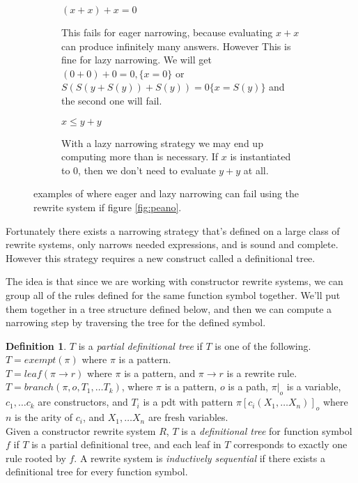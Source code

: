 \documentclass{book}
\theoremstyle{definition}
\newtheorem{definition}{Definition}[section]
\begin{document}
\begin{figure}[h]
  \begin{subfigure}{.45\textwidth}
      $(x + x) + x = 0$
    \caption{This fails for eager narrowing, because evaluating $x + x$ can produce infinitely many answers.
             However This is fine for lazy narrowing. We will get
             $(0 + 0) + 0 = 0, \{x = 0\}$
             or $S(S(y + S(y)) + S(y)) = 0 \{x = S(y)\}$
             and the second one will fail.}
  \end{subfigure}
  \hspace{.05\textwidth}
  \begin{subfigure}{.45\textwidth}
      $x \le y + y$
    \caption{With a lazy narrowing strategy we may end up computing more than is necessary.
             If $x$ is instantiated to $0$, then we don't need to evaluate $y + y$ at all.}
  \end{subfigure}
    \caption{examples of where eager and lazy narrowing can fail using the rewrite system
             if figure \ref{fig:peano}.}
    \label{NarrowingComp}
\end{figure}


Fortunately there exists a narrowing strategy that's defined on a large class of rewrite systems,
only narrows needed expressions, and is sound and complete.
However this strategy requires a new construct called a definitional tree.

The idea is that since we are working with constructor rewrite systems,
we can group all of the rules defined for the same function symbol together.
We'll put them together in a tree structure defined below, and 
then we can compute a narrowing step by traversing the tree for the defined symbol.


\theoremstyle{definition}
\begin{definition}
    $T$ is a \emph{partial definitional tree} if $T$ is one of the following.\\
    $T = exempt(\pi)$ where $\pi$ is a pattern.\\
    $T = leaf(\pi \to r)$ where $\pi$ is a pattern, and $\pi \to r$ is a rewrite rule.\\
    $T = branch(\pi, o, T_1, \ldots T_k)$, where $\pi$ is a pattern,
    $o$ is a path,
    $\pi\vert_o$ is a variable,
    $c_1,\ldots c_k$ are constructors,
    and $T_i$ is a pdt with pattern $\pi[c_i(X_1,\ldots X_n)]_o$ where $n$ is the arity of $c_i$,
    and $X_1,\ldots X_n$ are fresh variables.\\
    $\ $\\
    Given a constructor rewrite system $R$,
    $T$ is a \emph{definitional tree} for function symbol $f$ if
    $T$ is a partial definitional tree, and each leaf in $T$
    corresponds to exactly one rule rooted by $f$.
    A rewrite system is \emph{inductively sequential}
    if there exists a definitional tree for every function symbol.
\end{definition}
\end{document}
